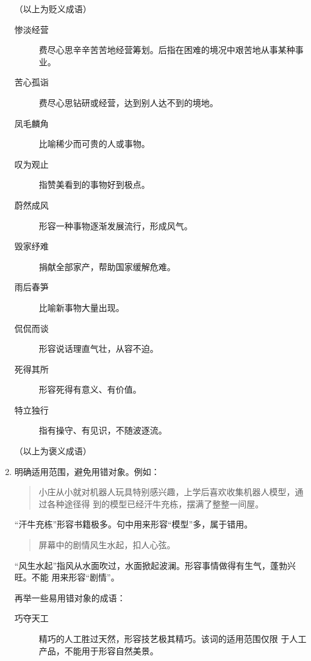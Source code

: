 \documentclass[final,oneside]{ctexbook}
\newenvironment{equotation}{\begin{quotation}\kaishu}{\end{quotation}}
\begin{document}
\begin{enumerate}
    （以上为贬义成语）

    \begin{description}

      \item[惨淡经营] 费尽心思辛辛苦苦地经营筹划。后指在困难的境况中艰苦地从事某种事业。

      \item[苦心孤诣] 费尽心思钻研或经营，达到别人达不到的境地。

      \item[凤毛麟角] 比喻稀少而可贵的人或事物。

      \item[叹为观止] 指赞美看到的事物好到极点。

      \item[蔚然成风] 形容一种事物逐渐发展流行，形成风气。

      \item[毁家纾难] 捐献全部家产，帮助国家缓解危难。

      \item[雨后春笋] 比喻新事物大量出现。

      \item[侃侃而谈] 形容说话理直气壮，从容不迫。

      \item[死得其所] 形容死得有意义、有价值。

      \item[特立独行] 指有操守、有见识，不随波逐流。
    \end{description}

    （以上为褒义成语）

  \item 明确适用范围，避免用错对象。例如：
    \begin{equotation}
      小庄从小就对机器人玩具特别感兴趣，上学后喜欢收集机器人模型，通过各种途径得
      到的模型已经汗牛充栋，摆满了整整一间屋。
    \end{equotation}
    “汗牛充栋”形容书籍极多。句中用来形容“模型”多，属于错用。
    \begin{equotation}
      屏幕中的剧情风生水起，扣人心弦。
    \end{equotation}
    “风生水起”指风从水面吹过，水面掀起波澜。形容事情做得有生气，蓬勃兴旺。不能
    用来形容“剧情”。

    再举一些易用错对象的成语：

    \begin{description}

      \item[巧夺天工] 精巧的人工胜过天然，形容技艺极其精巧。该词的适用范围仅限
        于人工产品，不能用于形容自然美景。


\end{description}
\end{enumerate}
\end{document}
